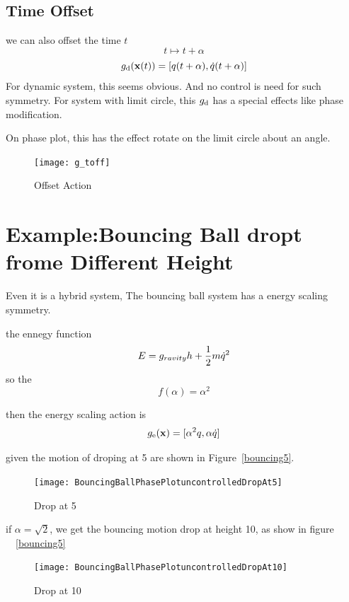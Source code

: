 \subsection*{Time Offset}
we can also offset the time $t$
\[
t \mapsto t+\alpha
\]
\[
g_{\mathrm{d}}(\mathbf{x}(t))=[q(t+\alpha),\dot{q}(t+\alpha)]
\]
For dynamic system, this seems obvious. And no control is need for such symmetry.
For system with limit circle, this $g_{\mathrm{d}}$ has a special effects like phase modification.

On phase plot, this has the effect rotate on the limit circle about an angle.
\begin{figure}[!htbp]
  \begin{center}
      \texttt{[image: g\_toff]}
    \caption{Offset Action}
    \label{fig:gtoff}
\end{center}
\end{figure}





\section{Example:Bouncing Ball dropt frome Different Height}
Even it is a hybrid system,
The bouncing ball system has a energy scaling symmetry.

the ennegy function 
\[
E=g_{ravity}h+\frac{1}{2}m\dot{q}^2
\]
so the 
\[
f(\alpha)=\alpha^2
\]

then the energy scaling action is
\[
g_{\mathrm{e}}(\mathbf{x})=[\alpha^2 q, \alpha \dot{q}]
\]

given the motion of droping at 5 are shown in Figure~\ref{bouncing5}.


\begin{figure}[!htbp]
  \begin{center}
      \texttt{[image: BouncingBallPhasePlotuncontrolledDropAt5]}
    \caption{Drop at 5}
    \label{fig:bouncing5}
\end{center}
\end{figure}

if $\alpha=\sqrt{2}$, we get the bouncing motion drop at height 10, as show in figure ~~\ref{bouncing5}
\begin{figure}[!htbp]
  \begin{center}
      \texttt{[image: BouncingBallPhasePlotuncontrolledDropAt10]}
    \caption{Drop at 10}
    \label{fig:bouncing10}
\end{center}
\end{figure}

